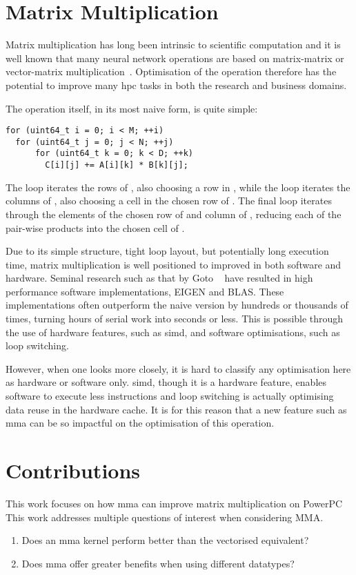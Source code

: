 \documentclass[\main/thesis.tex]{subfiles}
\begin{document}
\section{Matrix Multiplication}
Matrix multiplication has long been intrinsic to scientific computation and it is well known that many neural network operations are based on matrix-matrix or vector-matrix multiplication~\autocite{rojas1996neural,blue1992training}.
Optimisation of the operation therefore has the potential to improve many \gls{hpc} tasks in both the research and business domains.

The operation itself, in its most naive form, is quite simple:
\begin{lstlisting}[caption={[Basic Matrix Multiplication]A basic matrix multiplication.},label=lst:basicmatmul]
for (uint64_t i = 0; i < M; ++i)
  for (uint64_t j = 0; j < N; ++j)
      for (uint64_t k = 0; k < D; ++k)
        C[i][j] += A[i][k] * B[k][j];
\end{lstlisting}
The  loop iterates the rows of , also choosing a row in , while the  loop iterates the columns of , also choosing a cell in the chosen row of .
The final  loop iterates through the elements of the chosen row of  and column of , reducing each of the pair-wise products into the chosen cell of .

Due to its simple structure, tight loop layout, but potentially long execution time, matrix multiplication is well positioned to improved in both software and hardware.
Seminal research such as that by Goto \etal~\autocite{goto2008anatomy} have resulted in high performance software implementations, \eg EIGEN and BLAS.
These implementations often outperform the naive version by hundreds or thousands of times, turning hours of serial work into seconds or less.
This is possible through the use of hardware features, such as \gls{simd}, and software optimisations, such as loop switching.

However, when one looks more closely, it is hard to classify any optimisation here as hardware or software only.
\Gls{simd}, though it is a hardware feature, enables software to execute less instructions and loop switching is actually optimising data reuse in the hardware cache.
It is for this reason that a new feature such as \gls{mma} can be so impactful on the optimisation of this operation.

\section{Contributions}
This work focuses on how \gls{mma} can improve matrix multiplication on PowerPC
This work addresses multiple questions of interest when considering MMA.
\begin{enumerate}
  \item
    Does an \gls{mma} kernel perform better than the vectorised equivalent?
  \item
    Does \gls{mma} offer greater benefits when using different datatypes?
\end{enumerate}
\end{document}
